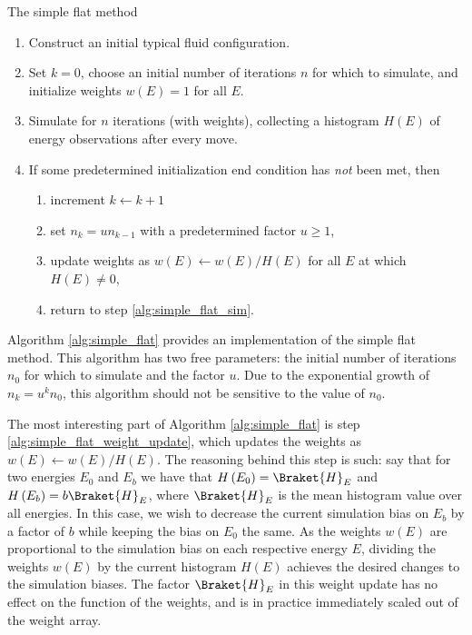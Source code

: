 \documentclass[11pt]{article}
\newcommand{\bk}{\Braket} %
\newcommand{\p}[1]{\left(#1\right)} %
\newenvironment{alg}
{\hrulefill\begin{enumerate}}
{\end{enumerate}\hrulefill}
\begin{document}
\begin{algorithm}[!t]
  \caption{The simple flat method}
  \label{alg:simple_flat}
  \begin{alg}

  \item Construct an initial typical fluid configuration.

  \item Set $k=0$, choose an initial number of iterations $n$ for
    which to simulate, and initialize weights $w\p{E}=1$ for all $E$.

  \item Simulate for $n$ iterations (with weights), collecting a
    histogram $H\p{E}$ of energy observations after every move.
    \label{alg:simple_flat_sim}

  \item If some predetermined initialization end condition has
    \emph{not} been met, then
    \begin{enumerate}
    \item increment $k\leftarrow k+1$
    \item set $n_k=un_{k-1}$ with a predetermined factor $u\ge1$,
      \label{alg:simple_flat_f}
    \item update weights as $w\p{E}\leftarrow w\p{E}/H\p{E}$ for all
      $E$ at which $H\p{E}\ne0$,
      \label{alg:simple_flat_weight_update}
    \item return to step \ref{alg:simple_flat_sim}.
    \end{enumerate}

  \end{alg}
\end{algorithm}

Algorithm \ref{alg:simple_flat} provides an implementation of the
simple flat method. This algorithm has two free parameters: the
initial number of iterations $n_0$ for which to simulate and the
factor $u$. Due to the exponential growth of $n_k=u^kn_0$, this
algorithm should not be sensitive to the value of $n_0$.

The most interesting part of Algorithm \ref{alg:simple_flat} is step
\ref{alg:simple_flat_weight_update}, which updates the weights as
$w\p{E}\leftarrow w\p{E}/H\p{E}$. The reasoning behind this step is
such: say that for two energies $E_0$ and $E_b$ we have that
$H\p{E_0}=\bk{H}_E$ and $H\p{E_b}=b\bk{H}_E$, where $\bk{H}_E$ is the
mean histogram value over all energies. In this case, we wish to
decrease the current simulation bias on $E_b$ by a factor of $b$ while
keeping the bias on $E_0$ the same. As the weights $w\p{E}$ are
proportional to the simulation bias on each respective energy $E$,
dividing the weights $w\p{E}$ by the current histogram $H\p{E}$
achieves the desired changes to the simulation biases. The factor
$\bk{H}_E$ in this weight update has no effect on the function of the
weights, and is in practice immediately scaled out of the weight
array.
\end{document}

